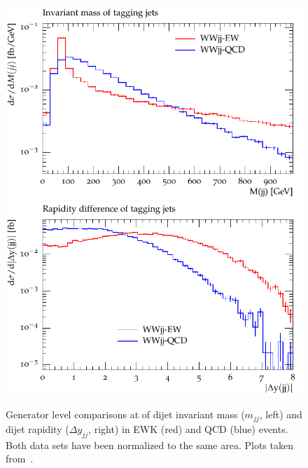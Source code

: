 \begin{figure}[htbp]
  \centering
  \includegraphics[width=.48\textwidth]{figs/ssww_13tev/introduction/Nm1_mjj}
  \includegraphics[width=.48\textwidth]{figs/ssww_13tev/introduction/Nm1_deltaY}
  \caption[Generator level comparisons at  of dijet invariant mass ($m_{jj}$, left) and dijet rapidity ($\Delta y_{jj}$, right) in EWK (red) and QCD (blue) \ssww events.  Both data sets have been normalized to the same area.]{Generator level comparisons at  of dijet invariant mass ($m_{jj}$, left) and dijet rapidity ($\Delta y_{jj}$, right) in EWK (red) and QCD (blue) \ssww events.  Both data sets have been normalized to the same area.  Plots taken from~\cite{2013.ssww-8tev-atlas-support}.}
  \label{fig:ssww13tev_dijet_comparison}
\end{figure}

